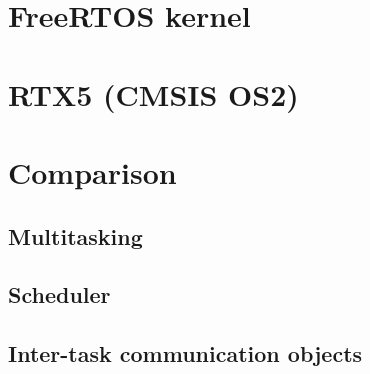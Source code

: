 \section*{FreeRTOS kernel}

\section*{RTX5 (CMSIS OS2)}

\section*{Comparison}

\subsection*{Multitasking}

\subsection*{Scheduler}

\subsection*{Inter-task communication objects}
